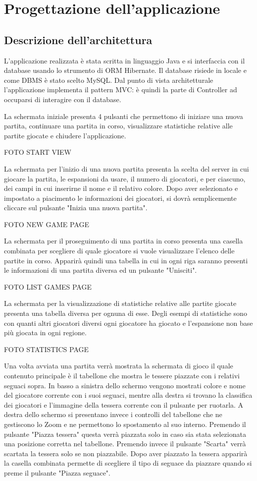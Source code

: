 \section{Progettazione dell'applicazione}
\subsection{Descrizione dell'architettura}
L'applicazione realizzata è stata scritta in linguaggio Java e si interfaccia con il database usando lo strumento di ORM Hibernate. Il database risiede in locale e come DBMS è stato scelto MySQL. Dal punto di vista architetturale l'applicazione implementa il pattern MVC: è quindi la parte di Controller ad occuparsi di interagire con il database.
\medskip

La schermata iniziale presenta 4 pulsanti che permettono di iniziare una nuova partita, continuare una partita in corso, visualizzare statistiche relative alle partite giocate e chiudere l'applicazione.

FOTO START VIEW

La schermata per l'inizio di una nuova partita presenta la scelta del server in cui giocare la partita, le espansioni da usare, il numero di giocatori, e per ciascuno, dei campi in cui inserirne il nome e il relativo colore. Dopo aver selezionato e impostato a piacimento le informazioni dei giocatori, si dovrà semplicemente cliccare sul pulsante "Inizia una nuova partita".

FOTO NEW GAME PAGE

La schermata per il proseguimento di una partita in corso presenta una casella combinata per scegliere di quale giocatore si vuole visualizzare l'elenco delle partite in corso. Apparirà quindi una tabella in cui in ogni riga saranno presenti le informazioni di una partita diversa ed un pulsante "Unisciti".

FOTO LIST GAMES PAGE

La schermata per la visualizzazione di statistiche relative alle partite giocate presenta una tabella diversa per ognuna di esse. Degli esempi di statistiche sono con quanti altri giocatori diversi ogni giocatore ha giocato e l'espansione non base più giocata in ogni regione.

FOTO STATISTICS PAGE

Una volta avviata una partita verrà mostrata la schermata di gioco il quale contenuto principale è il tabellone che mostra le tessere piazzate con i relativi seguaci sopra. In basso a sinistra dello schermo vengono mostrati colore e nome del giocatore corrente con i suoi seguaci, mentre alla destra si trovano la classifica dei giocatori e l'immagine della tessera corrente con il pulsante per ruotarla. A destra dello schermo si presentano invece i controlli del tabellone che ne gestiscono lo Zoom e ne permettono lo spostamento al suo interno. Premendo il pulsante "Piazza tessera" questa verrà piazzata solo in caso sia stata selezionata una posizione corretta nel tabellone. Premendo invece il pulsante "Scarta" verrà scartata la tessera solo se non piazzabile. Dopo aver piazzato la tessera apparirà la casella combinata permette di scegliere il tipo di seguace da piazzare quando si preme il pulsante "Piazza seguace".

